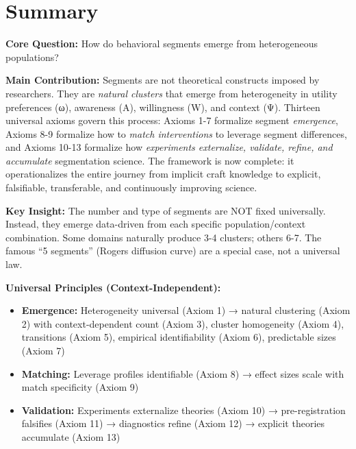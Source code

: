 \vspace{1em}

\section{Summary}
\label{sec:ba-summary}

\begin{tcolorbox}[colback=green!10!white, colframe=green!75!black,
    title=\textbf{Appendix PAP1: Summary}]

\textbf{Core Question:} How do behavioral segments emerge from heterogeneous populations?

\textbf{Main Contribution:}
Segments are not theoretical constructs imposed by researchers. They are
\textit{natural clusters} that emerge from heterogeneity in utility preferences (ω),
awareness (A), willingness (W), and context (Ψ). Thirteen universal axioms govern
this process: Axioms 1-7 formalize segment \textit{emergence}, Axioms 8-9 formalize how to
\textit{match interventions} to leverage segment differences, and Axioms 10-13 formalize how
\textit{experiments externalize, validate, refine, and accumulate} segmentation science.
The framework is now complete: it operationalizes the entire journey from implicit craft knowledge
to explicit, falsifiable, transferable, and continuously improving science.

\textbf{Key Insight:}
The number and type of segments are NOT fixed universally. Instead, they
emerge data-driven from each specific population/context combination. Some
domains naturally produce 3-4 clusters; others 6-7. The famous ``5 segments''
(Rogers diffusion curve) are a special case, not a universal law.

\textbf{Universal Principles (Context-Independent):}
\begin{itemize}[nosep]
\item \textbf{Emergence:} Heterogeneity universal (Axiom 1) → natural clustering (Axiom 2) with context-dependent count (Axiom 3), cluster homogeneity (Axiom 4), transitions (Axiom 5), empirical identifiability (Axiom 6), predictable sizes (Axiom 7)
\item \textbf{Matching:} Leverage profiles identifiable (Axiom 8) → effect sizes scale with match specificity (Axiom 9)
\item \textbf{Validation:} Experiments externalize theories (Axiom 10) → pre-registration falsifies (Axiom 11) → diagnostics refine (Axiom 12) → explicit theories accumulate (Axiom 13)
\end{itemize}


\end{tcolorbox}
